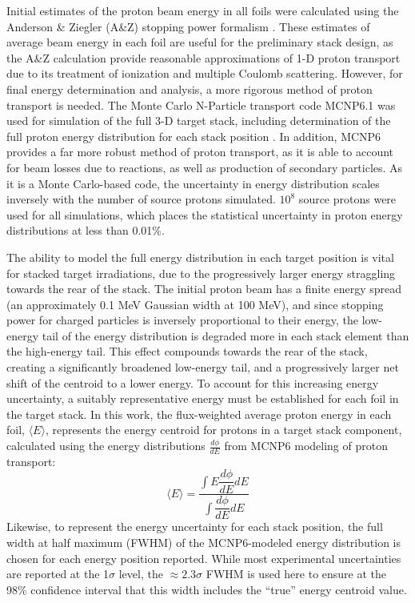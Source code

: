 \documentclass[%
 reprint,
superscriptaddress,
onecolumn,
linenumbers,
notitlepage,
 amsmath,amssymb,
 aps,
prc,
]{revtex4-1}
\begin{document}
Initial estimates of the proton beam energy in all foils were calculated using the Anderson \& Ziegler (A\&Z) stopping power formalism \cite{Andersen_Ziegler_1977,Ziegler1985,Ziegler1999}.
These estimates of average beam energy in each foil are useful for the preliminary stack design, as the A\&Z calculation provide reasonable approximations of 1-D proton transport due to its treatment of ionization and multiple Coulomb scattering. 
However, for final energy determination and analysis, a more rigorous method of proton transport is needed.
The Monte Carlo N-Particle transport code MCNP6.1 was used for simulation of the full 3-D target stack, including determination of the full proton energy distribution for each stack position   \cite{Goorley2012}.
In addition, MCNP6 provides a far more robust method of proton transport, as it is able to account for beam losses due to reactions, as well as production of secondary particles.
As it is a Monte Carlo-based code, the uncertainty in energy distribution scales inversely with the number of source protons simulated.  $10^8$ source protons were used for all simulations, which places the statistical uncertainty in proton energy distributions at less than 0.01\%.


The ability to model the full energy distribution in each target position is vital for stacked target irradiations, due to the progressively larger energy straggling towards the rear of the stack.
The initial proton beam has a finite energy spread (an approximately 0.1 MeV Gaussian width at 100 MeV), and since stopping power for charged particles is inversely proportional to their energy, the low-energy tail of the energy distribution is degraded more in each stack element than the high-energy tail.
This effect compounds  towards the rear of the stack, creating a significantly broadened low-energy tail, and a progressively larger net shift of the centroid to a lower energy. 
To account for this increasing energy uncertainty, a suitably representative energy must be established for  each foil in the target stack.
In this work, the flux-weighted average proton  energy in each foil, $\langle E \rangle$,  represents the energy centroid for protons in a target stack component, calculated using the energy distributions $\frac{d\phi}{dE}$ from MCNP6 modeling of proton transport:
\begin{equation}
\langle E \rangle = \dfrac{{\displaystyle\int E \dfrac{d\phi}{dE} dE}}{{\displaystyle\int \dfrac{d\phi}{dE} dE}}
\end{equation}
Likewise, to represent the energy uncertainty for each stack position, the full width at half maximum (FWHM) of the MCNP6-modeled energy distribution is chosen for each energy position reported.
While most experimental uncertainties are reported at the 1$\sigma$ level, the $\approx2.3\sigma$ FWHM is used here to ensure at the 98\% confidence interval that this width includes  the \enquote{true} energy centroid value.
\end{document}
